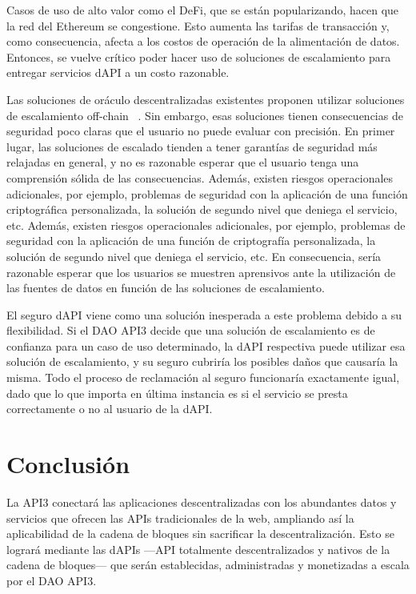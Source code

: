 \documentclass[11pt]{article}
\begin{document}
Casos de uso de alto valor como el DeFi, que se están popularizando, hacen que la red del Ethereum se congestione. Esto aumenta las tarifas de transacción y, como consecuencia, afecta a los costos de operación de la alimentación de datos. Entonces, se vuelve crítico poder hacer uso de soluciones de escalamiento para entregar servicios dAPI a un costo razonable.

Las soluciones de oráculo descentralizadas existentes proponen utilizar soluciones de escalamiento off-chain ~\cite{ellis:2017,band}.
Sin embargo, esas soluciones tienen consecuencias de seguridad poco claras que el usuario no puede evaluar con precisión. En primer lugar, las soluciones de escalado tienden a tener garantías de seguridad más relajadas en general, y no es razonable esperar que el usuario tenga una comprensión sólida de las consecuencias. Además, existen riesgos operacionales adicionales, por ejemplo, problemas de seguridad con la aplicación de una función criptográfica personalizada, la solución de segundo nivel que deniega el servicio, etc. Además, existen riesgos operacionales adicionales, por ejemplo, problemas de seguridad con la aplicación de una función de criptografía personalizada, la solución de segundo nivel que deniega el servicio, etc.  En consecuencia, sería razonable esperar que los usuarios se muestren aprensivos ante la utilización de las fuentes de datos en función de las soluciones de escalamiento.

El seguro dAPI viene como una solución inesperada a este problema debido a su flexibilidad. Si el DAO API3 decide que una solución de escalamiento es de confianza para un caso de uso determinado, la dAPI respectiva puede utilizar esa solución de escalamiento, y su seguro cubriría los posibles daños que causaría la misma. Todo el proceso de reclamación al seguro funcionaría exactamente igual, dado que lo que importa en última instancia es si el servicio se presta correctamente o no al usuario de la dAPI.


\section{Conclusión}
\label{sec:conclusion}

La API3 conectará las aplicaciones descentralizadas con los abundantes datos y servicios que ofrecen las APIs tradicionales de la web, ampliando así la aplicabilidad de la cadena de bloques sin sacrificar la descentralización. Esto se logrará mediante las dAPIs —API totalmente descentralizados y nativos de la cadena de bloques— que serán establecidas, administradas y monetizadas a escala por el DAO API3.
\end{document}
